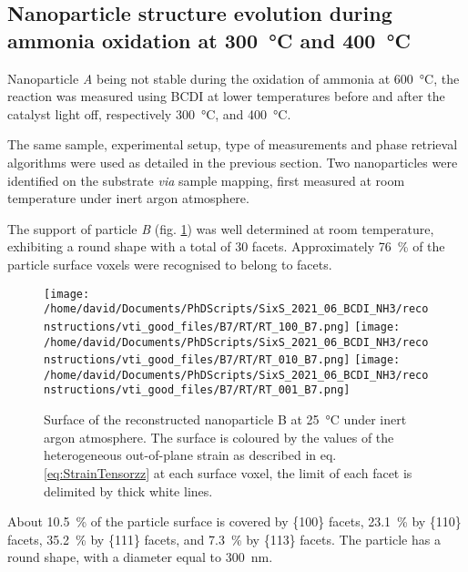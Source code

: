 \subsection{Nanoparticle structure evolution during ammonia oxidation at \qty{300}{\degreeCelsius} and \qty{400}{\degreeCelsius}}\label{sec:BCDIAmmoniaOxidation}

Nanoparticle \textit{A} being not stable during the oxidation of ammonia at \qty{600}{\degreeCelsius}, the reaction was measured using BCDI at lower temperatures before and after the catalyst light off, respectively \qty{300}{\degreeCelsius}, and \qty{400}{\degreeCelsius}.

The same sample, experimental setup, type of measurements and phase retrieval algorithms were used as detailed in the previous section.
Two nanoparticles were identified on the substrate \textit{via} sample mapping, first measured at room temperature under inert argon atmosphere.

The support of particle \textit{B} (fig. \ref{fig:B7Facets}) was well determined at room temperature, exhibiting a round shape with a total of 30 facets.
Approximately \qty{76}{\percent} of the particle surface voxels were recognised to belong to facets.

\begin{figure}[!htb]
    \centering
    \texttt{[image: /home/david/Documents/PhDScripts/SixS\_2021\_06\_BCDI\_NH3/reconstructions/vti\_good\_files/B7/RT/RT\_100\_B7.png]}
    \texttt{[image: /home/david/Documents/PhDScripts/SixS\_2021\_06\_BCDI\_NH3/reconstructions/vti\_good\_files/B7/RT/RT\_010\_B7.png]}
    \texttt{[image: /home/david/Documents/PhDScripts/SixS\_2021\_06\_BCDI\_NH3/reconstructions/vti\_good\_files/B7/RT/RT\_001\_B7.png]}
    \caption{
        Surface of the reconstructed nanoparticle B at \qty{25}{\degreeCelsius} under inert argon atmosphere.
        The surface is coloured by the values of the heterogeneous out-of-plane strain as described in eq. \ref{eq:StrainTensorzz} at each surface voxel, the limit of each facet is delimited by thick white lines.
    }
    \label{fig:B7Facets}
\end{figure}

About \qty{10.5}{\percent} of the particle surface is covered by \{100\} facets, \qty{23.1}{\percent} by \{110\} facets, \qty{35.2}{\percent} by \{111\} facets, and \qty{7.3}{\percent} by \{113\} facets.
The particle has a round shape, with a diameter equal to \qty{300}{\nm}.

